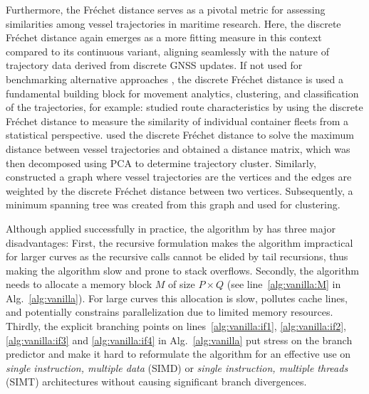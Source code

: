 Furthermore, the Fr\'echet distance serves as a pivotal metric for assessing similarities among vessel trajectories in maritime research.
Here, the discrete Fr\'echet distance again emerges as a more fitting measure in this context compared to its continuous variant, aligning seamlessly with the nature of trajectory data derived from discrete GNSS updates.
If not used for benchmarking alternative approaches \citep{li20,liu23,luo23}, the discrete Fr\'echet distance is used a fundamental building block for movement analytics, clustering, and classification of the trajectories, for example:
\citet{sakan23} studied route characteristics by using the discrete Fr\'{e}chet distance to measure the similarity of individual container fleets from a statistical perspective.
\citet{cao18} used the discrete Fr\'{e}chet distance to solve the maximum distance between vessel trajectories and obtained a distance matrix, which was then decomposed using PCA to determine trajectory cluster.
Similarly, \citet{roberts18} constructed a graph where vessel trajectories are the vertices and the edges are weighted by the discrete Fr\'echet distance between two vertices.
Subsequently, a minimum spanning tree was created from this graph and used for clustering.

Although applied successfully in practice, the algorithm by \citet{eiter94} has three major disadvantages:
First, the recursive formulation makes the algorithm impractical for larger curves as the recursive calls cannot be elided by tail recursions, thus making the algorithm slow and prone to stack overflows.
Secondly, the algorithm needs to allocate a memory block $M$ of size $P \times Q$ (see line~\ref{alg:vanilla:M} in Alg.~\ref{alg:vanilla}).
For large curves this allocation is slow, pollutes cache lines, and potentially constrains parallelization due to limited memory resources.
Thirdly, the explicit branching points on lines~\ref{alg:vanilla:if1}, \ref{alg:vanilla:if2}, \ref{alg:vanilla:if3} and \ref{alg:vanilla:if4} in Alg.~\ref{alg:vanilla} put stress on the branch predictor and make it hard to reformulate the algorithm for an effective use on \textit{single instruction, multiple data} (SIMD) or \textit{single instruction, multiple threads} (SIMT) architectures without causing significant branch divergences.

